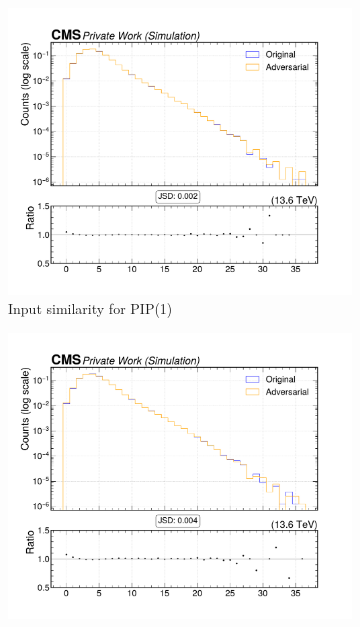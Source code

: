 \begin{figure}[htbp]
  \centering
  \begin{subfigure}[t]{0.32\textwidth}
    \includegraphics[width=\linewidth]{media/output/features/compare/intprob_1/cmp_global_features_TagVarCSV_jetNSelectedTracks.pdf}
    \caption{Input similarity for PIP(1)}
  \end{subfigure}\hfill
  \begin{subfigure}[t]{0.32\textwidth}
    \includegraphics[width=\linewidth]{media/output/features/compare/intprob_2/cmp_global_features_TagVarCSV_jetNSelectedTracks.pdf}

\end{subfigure}
\end{figure}
